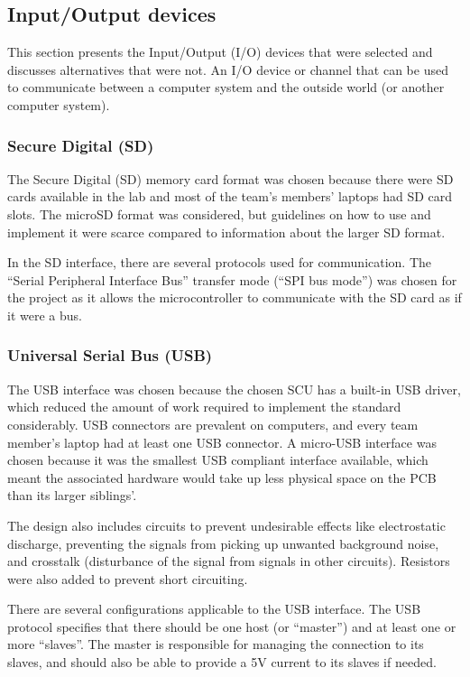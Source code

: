 \subsection{Input/Output devices} \label{pcb:design-choices:ss:IO_devices}
This section presents the Input/Output (I/O) devices that were selected and discusses alternatives that were not.
An I/O device or channel that can be used to communicate between a computer system and the outside world (or another computer system).

\subsubsection{Secure Digital (SD)} 
The Secure Digital (SD) memory card format was chosen because there were SD cards available in the lab and most of the team's members' laptops had SD card slots.
The microSD format was considered, but guidelines on how to use and implement it were scarce compared to information about the larger SD format.

In the SD interface, there are several protocols used for communication. 
The ``Serial Peripheral Interface Bus'' transfer mode (``SPI bus mode'') was chosen for the project as it allows the microcontroller to communicate with the SD card as if it were a bus.


\subsubsection{Universal Serial Bus (USB)}
The USB interface was chosen because the chosen SCU has a built-in USB driver, which reduced the amount of work required to implement the standard considerably.
USB connectors are prevalent on computers, and every team member's laptop had at least one USB connector.
A micro-USB interface was chosen because it was the smallest USB compliant interface available, which meant the associated hardware would take up less physical space on the PCB than its larger siblings'.

The design also includes circuits to prevent undesirable effects like electrostatic discharge, preventing the signals from picking up unwanted background noise, and crosstalk (disturbance of the signal from signals in other circuits).
Resistors were also added to prevent short circuiting.

There are several configurations applicable to the USB interface.
The USB protocol specifies that there should be one host (or ``master'') and at least one or more ``slaves''.
The master is responsible for managing the connection to its slaves, and should also be able to provide a 5V current to its slaves if needed.


